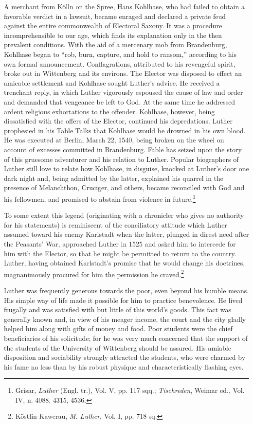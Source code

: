A merchant from Kölln on the Spree, Hans Kohlhase, who had
failed to obtain a favorable verdict in a lawsuit, became enraged and
declared a private feud against the entire commonwealth of Electoral
Saxony. It was a procedure incomprehensible to our age, which finds
its explanation only in the then prevalent conditions. With the aid
of a mercenary mob from Brandenburg, Kohlhase began to “rob,
burn, capture, and hold to ransom,” according to his own formal
announcement. Conflagrations, attributed to his revengeful spirit,
broke out in Wittenberg and its environs. The Elector was disposed
to effect an amicable settlement and Kohlhase sought Luther’s advice.
He received a trenchant reply, in which Luther vigorously espoused
the cause of law and order and demanded that vengeance be left to
God. At the same time he addressed ardent religious exhortations to
the offender. Kohlhase, however, being dissatisfied with the offers of
the Elector, continued his depredations. Luther prophesied in his Table
Talks that Kohlhase would be drowned in his own blood. He was
executed at Berlin, March 22, 1540, being broken on the wheel on
account of excesses committed in Brandenburg. Fable has seized upon
the story of this gruesome adventurer and his relation to Luther.
Popular biographers of Luther still love to relate how Kohlhase, in
disguise, knocked at Luther’s door one dark night and, being admitted
by the latter, explained his quarrel in the presence of Melanchthon, Cruciger,
and others, became reconciled with God and his fellowmen, and promised
to abstain from violence in future.\footnote
{Grisar, \textit{Luther} (Engl. tr.), Vol. V, pp. 117 sqq.; \textit{Tischreden}, Weimar ed., Vol. IV,
n. 4088, 4315, 4536.}

To some extent this legend (originating with a chronicler who
gives no authority for his statements) is reminiscent of the conciliatory
attitude which Luther assumed toward his enemy Karlstadt when the latter,
plunged in direst need after the Peasants’ War,
approached Luther in 1525 and asked him to intercede for him with
the Elector, so that he might be permitted to return to the country.
Luther, having obtained Karlstadt’s promise that he would change
his doctrines, magnanimously procured for him the permission he
craved.\footnote{Köstlin-Kawerau, \textit{M. Luther}, Vol. I, pp. 718 sq.}

Luther was frequently generous towards the poor, even beyond
his humble means. His simple way of life made it possible for him to
practice benevolence. He lived frugally and was satisfied with but
little of this world’s goods. This fact was generally known and, in
view of his meager income, the court and the city gladly helped him
along with gifts of money and food. Poor students were the chief
beneficiaries of his solicitude; for he was very much concerned that
the support of the students of the University of Wittenberg should
be assured. His amiable disposition and sociability strongly attracted
the students, who were charmed by his fame no less than by his robust
physique and characteristically flashing eyes.

